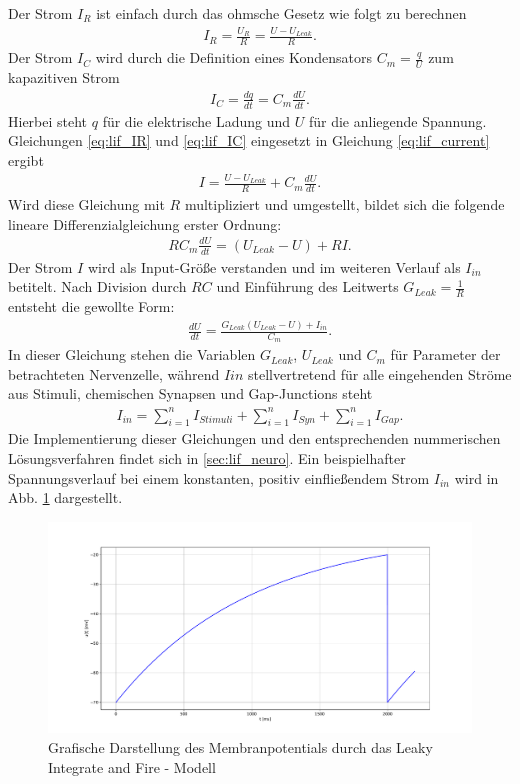 	Der Strom $I_R$ ist einfach durch das ohmsche Gesetz wie folgt zu berechnen
	\begin{align}
		\label{eq:lif_IR}
		I_R = \frac{U_R}{R} = \frac{U - U_{Leak}}{R}\text{.}
	\end{align}
	Der Strom $I_C$ wird durch die Definition eines Kondensators $C_m = \tfrac{q}{U}$ zum kapazitiven Strom 
	\begin{align}
		\label{eq:lif_IC}
		I_C = \frac{dq}{dt} = C_m \frac{dU}{dt}\text{.}
	\end{align}
	Hierbei steht $q$ für die elektrische Ladung und $U$ für die anliegende Spannung.\\
	Gleichungen \ref{eq:lif_IR} und \ref{eq:lif_IC} eingesetzt in Gleichung \ref{eq:lif_current} ergibt
	\begin{align}
		\label{eq:lif_I}
		I = \frac{U - U_{Leak}}{R} + C_m\frac{dU}{dt}\text{.}
	\end{align}
	Wird diese Gleichung mit $R$ multipliziert und umgestellt, bildet sich die folgende lineare Differenzialgleichung erster Ordnung:
	\begin{align}
		\label{eq:lif_nd}
		R C_m \frac{dU}{dt} = (U_{Leak} - U) + R I\text{.}
	\end{align}
	Der Strom $I$ wird als Input-Größe verstanden und im weiteren Verlauf als $I_{in}$ betitelt. Nach Division durch $RC$ und Einführung des Leitwerts $G_{Leak} = \tfrac{1}{R}$ entsteht die gewollte Form:
	\begin{align}
		\label{eq:lif}
		\frac{dU}{dt} = \frac{G_{Leak}(U_{Leak} - U) + I_{in}}{C_m}\text{.}
	\end{align}
	In dieser Gleichung stehen die Variablen $G_{Leak}$, $U_{Leak}$ und $C_m$ für Parameter der betrachteten Nervenzelle, während $I{in}$ stellvertretend für alle eingehenden Ströme aus Stimuli, chemischen Synapsen und Gap-Junctions steht
	\begin{align}
		\label{eq:lif_current_in}
		I_{in} = \sum_{i = 1}^{n}{I_{Stimuli}} + \sum_{i = 1}^{n}{I_{Syn}} + \sum_{i = 1}^{n}{I_{Gap}}\text{.}
	\end{align}
	Die Implementierung dieser Gleichungen und den entsprechenden nummerischen Lösungsverfahren findet sich in \ref{sec:lif_neuro}. Ein beispielhafter Spannungsverlauf bei einem konstanten, positiv einfließendem Strom $I_{in}$ wird in Abb. \ref{fig:simple_lif} dargestellt.
	\begin{figure}[h]
		\centering
		\includegraphics[width=12cm]{figures/chap_lif/Simple_LIF.pdf}
		\caption{Grafische Darstellung des Membranpotentials durch das Leaky Integrate and Fire - Modell}
		\label{fig:simple_lif}
	\end{figure}
